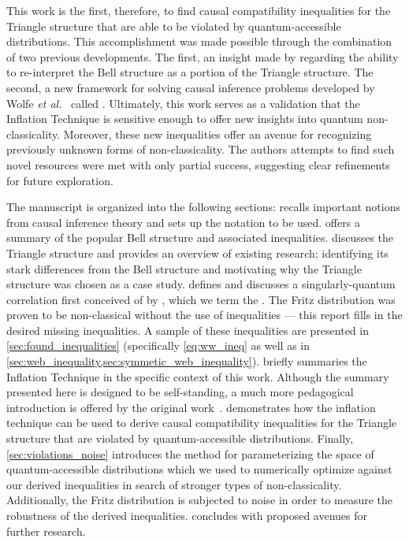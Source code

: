 \documentclass[aps, 10pt, english, twoside, pra, nofootinbib, tightenlines, longbibliography, superscriptaddress]{revtex4-1}
\begin{document}
    This work is the first, therefore, to find causal compatibility inequalities for the Triangle structure that are able to be violated by quantum-accessible distributions. This accomplishment was made possible through the combination of two previous developments. The first, an insight made by \citet{Fritz_2012} regarding the ability to re-interpret the Bell structure as a portion of the Triangle structure. The second, a new framework for solving causal inference problems developed by Wolfe \emph{et al.}~\cite{Inflation} called . Ultimately, this work serves as a validation that the Inflation Technique is sensitive enough to offer new insights into quantum non-classicality. Moreover, these new inequalities offer an avenue for recognizing previously unknown forms of non-classicality. The authors attempts to find such novel resources were met with only partial success, suggesting clear refinements for future exploration.

    The manuscript is organized into the following sections:  recalls important notions from causal inference theory and sets up the notation to be used.  offers a summary of the popular Bell structure and associated inequalities.  discusses the Triangle structure and provides an overview of existing research; identifying its stark differences from the Bell structure and motivating why the Triangle structure was chosen as a case study.  defines and discusses a singularly-quantum correlation first conceived of by \citet{Fritz_2012}, which we term the . The Fritz distribution was proven to be non-classical without the use of inequalities --- this report fills in the desired missing inequalities. A sample of these inequalities are presented in \cref{sec:found_inequalities} (specifically \cref{eq:ww_ineq} as well as in \cref{sec:web_inequality,sec:symmetic_web_inequality}).  briefly summaries the Inflation Technique in the specific context of this work. Although the summary presented here is designed to be self-standing, a much more pedagogical introduction is offered by the original work~\cite{Inflation}.  demonstrates how the inflation technique can be used to derive causal compatibility inequalities for the Triangle structure that are violated by quantum-accessible distributions. Finally, \cref{sec:violations_noise} introduces the method for parameterizing the space of quantum-accessible distributions which we used to numerically optimize against our derived inequalities in search of stronger types of non-classicality. Additionally, the Fritz distribution is subjected to noise in order to measure the robustness of the derived inequalities.  concludes with proposed avenues for further research.
\end{document}
